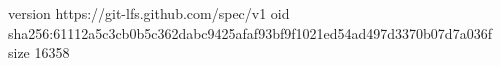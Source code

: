 version https://git-lfs.github.com/spec/v1
oid sha256:61112a5c3cb0b5c362dabc9425afaf93bf9f1021ed54ad497d3370b07d7a036f
size 16358
